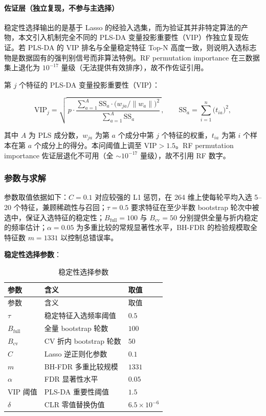 \documentclass{../../latex/templates/mcm-paper}
\begin{document}
\paragraph{佐证层（独立复现，不参与主选择）}

稳定性选择输出的是基于 Lasso 的经验入选集，而为验证其并非特定算法的产物，本文引入机制完全不同的 PLS-DA 变量投影重要性（VIP）作独立复现佐证。若 PLS-DA 的 VIP 排名与全量稳定特征 Top-N 高度一致，则说明入选标志物是数据固有的强判别信号而非算法特例。RF permutation importance 在三数据集上退化为 $10^{-17}$ 量级（无法提供有效排序），故不作佐证引用。

第 $j$ 个特征的 PLS-DA 变量投影重要性（VIP）：

\begin{equation}
\mathrm{VIP}_j = \sqrt{\,p\cdot\frac{\sum_{a=1}^{A}\mathrm{SS}_a\cdot\big(w_{ja}/\lVert w_a\rVert\big)^2}{\sum_{a=1}^{A}\mathrm{SS}_a}\,},
  \qquad
  \mathrm{SS}_a = \sum_{i=1}^{n}\big(t_{ia}\big)^2,
\label{eq:s2-vip}
\end{equation}

其中 $A$ 为 PLS 成分数，$w_{ja}$ 为第 $a$ 个成分中第 $j$ 个特征的权重，$t_{ia}$ 为第 $i$ 个样本在第 $a$ 个成分上的得分。本问阈值上调至 $\mathrm{VIP}>1.5$。RF permutation importance 佐证层退化不可用（全 $\sim10^{-17}$ 量级），故不引用 RF 数字。

\subsubsection{参数与求解}

参数取值依据如下：$C=0.1$ 对应较强的 L1 惩罚，在 264 维上使每轮平均入选 5--20 个特征，兼顾稀疏性与召回；$\tau=0.5$ 要求特征在至少半数 bootstrap 轮次中被选中，保证入选特征的稳定性；$B_{\text{full}}=100$ 与 $B_{\text{cv}}=50$ 分别提供全量与折内稳定的频率估计；$\alpha=0.05$ 为多重比较的常规显著性水平，BH-FDR 的检验规模取全特征数 $m=1331$ 以控制总错误率。

\textbf{稳定性选择参数}：

{\small
\begin{longtable}{>{\centering\arraybackslash}p{}>{\centering\arraybackslash}p{}>{\centering\arraybackslash}p{}}
\caption{稳定性选择参数}\label{tab:s2-params}\\
\toprule
参数 & 含义 & 取值 \\
\midrule
\endfirsthead
\toprule
参数 & 含义 & 取值 \\
\midrule
\endhead
\bottomrule
\endlastfoot
$\tau$ & 稳定特征入选频率阈值 & $0.5$ \\
$B_{\text{full}}$ & 全量 bootstrap 轮数 & $100$ \\
$B_{\text{cv}}$ & CV 折内 bootstrap 轮数 & $50$ \\
$C$ & Lasso 逆正则化参数 & $0.1$ \\
$m$ & BH-FDR 多重比较规模 & $1331$ \\
$\alpha$ & FDR 显著性水平 & $0.05$ \\
$\mathrm{VIP}$ 阈值 & PLS-DA 重要性阈值 & $1.5$ \\
$\delta$ & CLR 零值替换伪值 & $6.5\times10^{-6}$ \\
\end{longtable}
}
\end{document}
